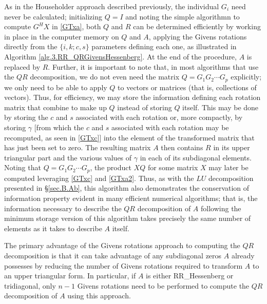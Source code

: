As in the Householder approach described previously, the individual
$G_{i}$ need never be calculated; initializing $Q=I$ and noting the
simple algorithmn to compute $G^{H}X$ in \eqref{GTxa},
both $Q$ and $R$ can be determined efficiently by working in
place in the computer memory on $Q$ and $A$, applying the Givens
rotations directly from the $\{i,k;c,s\}$ parameters defining each
one, as illustrated in Algorithm \ref{alg.3.RR_QRGivensHessenberg}.
At the end of the procedure, $A$ is replaced by $R$.  Further, it is important to note that, in most algorithms
that use the $QR$ decomposition, we do not even need the matrix
$Q=G_{1}G_{2}\cdots G_{p}$ explicitly; we only need to be able to
apply $Q$ to vectors or matrices (that is, collections of vectors).
Thus, for efficiency, we may store the information defining each
rotation matrix that combine to make up $Q$ instead of storing $Q$ itself.  This may be done by storing the $c$ and $s$ associated with each rotation or,
more compactly, by storing $\gamma$ [from which the $c$ and $s$ associated with each rotation may be recomputed,
as seen in \eqref{GTxc}] into the element of the transformed matrix that has
just been set to zero.  The resulting matrix $A$ then contains $R$ in
its upper triangular part and the various values of $\gamma$ in each
of its subdiagonal elements.  Noting that $Q=G_{1}G_{2}\cdots G_{p}$, the product $XQ$ for some matrix
$X$ may later be computed leveraging \eqref{GTxc} and \eqref{GTxa2}.
Thus, as with the $LU$ decomposition presented in \S \ref{sec.B.Ab},
this algorithm also demonstrates the conservation of information
property evident in many efficient numerical algorithms; that is, the
information necessary to describe the $QR$ decomposition of $A$
following the minimum storage version of this algorithm takes precisely
the same number of elements as it takes to describe $A$ itself.

The primary advantage of the Givens rotations approach to computing
the $QR$ decomposition is that it can take advantage of any subdiagonal zeros $A$ already possesses by reducing the number of Givens
rotations required to transform $A$ to an upper triangular form.  In particular,
if $A$ is either RR_Hessenberg or tridiagonal, only $n-1$ Givens
rotations need to be performed to compute the $QR$ decomposition of
$A$ using this approach.

\enlargethispage{3pt}

\begin{figure*}[t]

\end{figure*}

